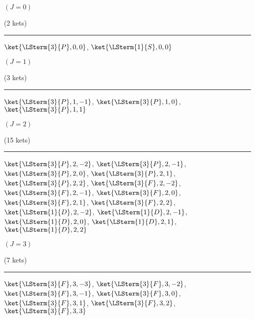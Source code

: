 \begin{mdframed}
\begin{center}
$(J=0)$


(2 kets)
\vspace{0.25cm}\hrule\vspace{0.25cm}
$\ket{\LSterm{3}{P},0,0}$, $\ket{\LSterm{1}{S},0,0}$
\end{center}
\end{mdframed}

\begin{mdframed}
\begin{center}
$(J=1)$


(3 kets)
\vspace{0.25cm}\hrule\vspace{0.25cm}
$\ket{\LSterm{3}{P},1,-1}$, $\ket{\LSterm{3}{P},1,0}$, $\ket{\LSterm{3}{P},1,1}$
\end{center}
\end{mdframed}

\begin{mdframed}
\begin{center}
$(J=2)$


(15 kets)
\vspace{0.25cm}\hrule\vspace{0.25cm}
$\ket{\LSterm{3}{P},2,-2}$, $\ket{\LSterm{3}{P},2,-1}$, $\ket{\LSterm{3}{P},2,0}$, $\ket{\LSterm{3}{P},2,1}$, $\ket{\LSterm{3}{P},2,2}$, $\ket{\LSterm{3}{F},2,-2}$, $\ket{\LSterm{3}{F},2,-1}$, $\ket{\LSterm{3}{F},2,0}$, $\ket{\LSterm{3}{F},2,1}$, $\ket{\LSterm{3}{F},2,2}$, $\ket{\LSterm{1}{D},2,-2}$, $\ket{\LSterm{1}{D},2,-1}$, $\ket{\LSterm{1}{D},2,0}$, $\ket{\LSterm{1}{D},2,1}$, $\ket{\LSterm{1}{D},2,2}$
\end{center}
\end{mdframed}

\begin{mdframed}
\begin{center}
$(J=3)$


(7 kets)
\vspace{0.25cm}\hrule\vspace{0.25cm}
$\ket{\LSterm{3}{F},3,-3}$, $\ket{\LSterm{3}{F},3,-2}$, $\ket{\LSterm{3}{F},3,-1}$, $\ket{\LSterm{3}{F},3,0}$, $\ket{\LSterm{3}{F},3,1}$, $\ket{\LSterm{3}{F},3,2}$, $\ket{\LSterm{3}{F},3,3}$
\end{center}
\end{mdframed}

